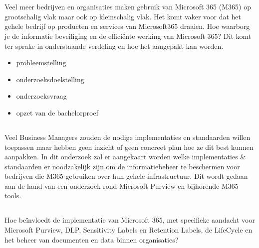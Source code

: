 
\chapter{}%
\label{ch:inleiding}

Veel meer bedrijven en organisaties maken gebruik van Microsoft 365 (M365) op grootschalig vlak maar ook op kleinschalig vlak.
Het komt vaker voor dat het gehele bedrijf op producten en services van Microsoft365 draaien. Hoe waarborg je de informatie beveiliging en de efficiënte werking van Microsoft 365?
Dit komt ter sprake in onderstaande verdeling en hoe het aangepakt kan worden.

\begin{itemize}
  \item probleemstelling
  \item onderzoeksdoelstelling
  \item onderzoeksvraag
  \item opzet van de bachelorproef
\end{itemize}

\section{}%
\label{sec:probleemstelling}

Veel Business Managers zouden de nodige implementaties en standaarden willen toepassen maar hebben geen inzicht of geen concreet plan hoe ze dit best kunnen aanpakken.
In dit onderzoek zal er aangekaart worden welke implementaties & standaarden er noodzakelijk zijn om de informatiebeheer te beschermen voor bedrijven die M365 gebruiken over hun gehele infrastructuur.
Dit wordt gedaan aan de hand van een onderzoek rond Microsoft Purview en bijhorende M365 tools.


\section{}%
\label{sec:onderzoeksvraag}


Hoe beïnvloedt de implementatie van Microsoft 365, met specifieke aandacht voor Microsoft Purview, DLP, Sensitivity Labels en Retention Labels, de LifeCycle en het beheer van documenten en data binnen organisaties?

